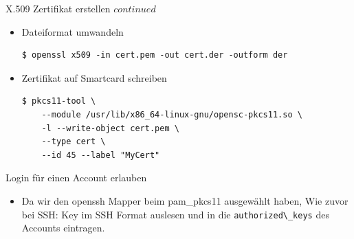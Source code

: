 \documentclass{beamer}
\begin{document}
\begin{frame}[fragile]{X.509 Zertifikat erstellen \(continued\)}
\begin{minipage}[t][\textheight][t]{\linewidth}
\begin{itemize}
	\item Dateiformat umwandeln
	\begin{lstlisting}
$ openssl x509 -in cert.pem -out cert.der -outform der	
	\end{lstlisting}
	\item Zertifikat auf Smartcard schreiben
	\begin{lstlisting}
$ pkcs11-tool \
    --module /usr/lib/x86_64-linux-gnu/opensc-pkcs11.so \ 
    -l --write-object cert.pem \
    --type cert \
    --id 45 --label "MyCert"
	\end{lstlisting}
\end{itemize}
\end{minipage}
\end{frame}

\begin{frame}[fragile]{Login für einen Account erlauben}
\begin{minipage}[t][\textheight][t]{\linewidth}
\begin{itemize}
  \item Da wir den openssh Mapper beim pam\_pkcs11 ausgewählt haben, Wie zuvor
  bei SSH: Key im SSH Format auslesen und in die \lstinline|authorized\_keys|
  des Accounts eintragen.
\end{itemize}
\begin{lstlisting}

\end{lstlisting}
\end{minipage}
\end{frame}
\end{document}
